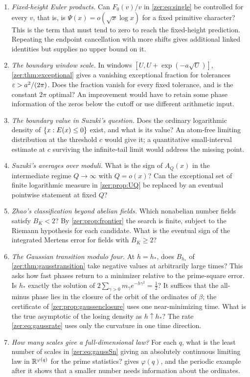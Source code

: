 \begin{enumerate}
\item \emph{Fixed-height Euler products.} Can $F_0(v)/v$ in \eqref{zer:eq:single} be
controlled for every $v$, that is, is $\Psi(x)=o(\sqrt x\log x)$ for a fixed primitive
character? This is the term that must tend to zero to reach the fixed-height prediction.
Repeating the endpoint cancellation with more shifts gives additional linked identities
but supplies no upper bound on it.
\item \emph{The boundary window scale.} In windows $[U,U+\exp(-a\sqrt U)]$,
\cref{zer:thm:exceptional} gives a vanishing exceptional fraction for tolerances
$\varepsilon>a^2/(2\pi)$. Does the fraction vanish for every fixed tolerance, and is the constant
$2\pi$ optimal? An improvement would have to retain some phase information of the zeros
below the cutoff or use different arithmetic input.
\item \emph{The boundary value in Suzuki's question.} Does the ordinary logarithmic
density of $\{x:E(x)\le0\}$ exist, and what is its value? An atom-free limiting
distribution at the threshold $c$ would give it; a quantitative small-interval estimate at
$c$ surviving the infinite-tail limit would address the missing point.
\item \emph{Suzuki's averages over moduli.} What is the sign of $A_Q(x)$ in the
intermediate regime $Q\to\infty$ with $Q=o(x)$? Can the exceptional set of finite
logarithmic measure in \cref{zer:prop:UQ} be replaced by an eventual pointwise statement
at fixed $Q$?
\item \emph{Zhao's classification beyond abelian fields.} Which nonabelian number fields
satisfy $B_K<2$? By \cref{zer:prop:frontier} the search is finite, subject to the Riemann
hypothesis for each candidate. What is the eventual sign of the integrated Mertens error
for fields with $B_K\ge2$?
\item \emph{The Gaussian transition modulo four.} At $h=h_*$, does $B_{h_*}$ of
\cref{zer:thm:gausstransition} take negative values at arbitrarily large times? This asks how fast
phases return to a minimizer relative to the prime-square error. Is $h_*$ exactly the solution of
$2\sum_{\gamma>0}m_\gamma e^{-h\gamma^2}=\tfrac12$? It suffices that the all-minus phase lies in the
closure of the orbit of the ordinates of $\beta$; the certificate of \cref{zer:prop:gaussenclosure}
uses one near-minimizing time. What is the true asymptotic of the losing density as $h\uparrow h_*$?
The rate \eqref{zer:eq:gaussrate} uses only the curvature in one time direction.
\item \emph{How many scales give a full-dimensional law?} For each $q$, what is the least number of
scales in \eqref{zer:eq:gaussSn} giving an absolutely continuous limiting law in $\mathbb{R}^{\varphi(q)}$
for the prime statistics?  gives $\varphi(q)$, and the periodic example after it
shows that a smaller number needs information about the ordinates.
\end{enumerate}
